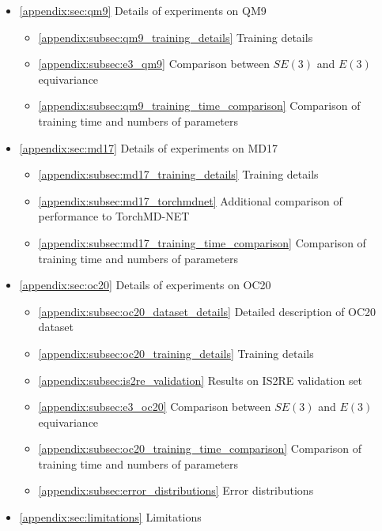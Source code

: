 \begin{itemize}
    \item[] \ref{appendix:sec:qm9} Details of experiments on QM9
    \begin{itemize}
        \item[] \ref{appendix:subsec:qm9_training_details} Training details
        \item[] \ref{appendix:subsec:e3_qm9} Comparison between $SE(3)$ and $E(3)$ equivariance
        \item[] \ref{appendix:subsec:qm9_training_time_comparison} Comparison of training time and numbers of parameters
    \end{itemize}
    \item[] \ref{appendix:sec:md17} Details of experiments on MD17
    \begin{itemize}
        \item[] \ref{appendix:subsec:md17_training_details} Training details
        \item[] \ref{appendix:subsec:md17_torchmdnet} Additional comparison of performance to TorchMD-NET
        \item[] \ref{appendix:subsec:md17_training_time_comparison} Comparison of training time and numbers of parameters
    \end{itemize}
    \item[] \ref{appendix:sec:oc20} Details of experiments on OC20
    \begin{itemize}
        \item[] \ref{appendix:subsec:oc20_dataset_details} Detailed description of OC20 dataset
        \item[] \ref{appendix:subsec:oc20_training_details} Training details
        \item[] \ref{appendix:subsec:is2re_validation} Results on IS2RE validation set
        \item[] \ref{appendix:subsec:e3_oc20} Comparison between $SE(3)$ and $E(3)$ equivariance
        \item[] \ref{appendix:subsec:oc20_training_time_comparison} Comparison of training time and numbers of parameters
        \item[] \ref{appendix:subsec:error_distributions} Error distributions
    \end{itemize}
    \item[]
    \ref{appendix:sec:limitations} Limitations
    
    
\end{itemize}


